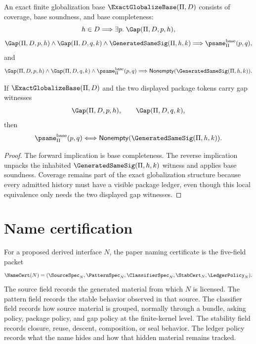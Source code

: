 \begin{definition}
\label{def:ask-sig-spine-exact-globalize-base}
An exact finite globalization base $\ExactGlobalizeBase(\Pi,D)$ consists of
coverage, base soundness, and base completeness:
$$
h\in D
\Longrightarrow
\exists p.\;\Gap(\Pi,D,p,h),
$$
$$
\Gap(\Pi,D,p,h)
\wedge
\Gap(\Pi,D,q,k)
\wedge
\GeneratedSameSig(\Pi,h,k)
\Longrightarrow
\psame^{\mathrm{base}}_{\Pi}(p,q),
$$
and
$$
\Gap(\Pi,D,p,h)
\wedge
\Gap(\Pi,D,q,k)
\wedge
\psame^{\mathrm{base}}_{\Pi}(p,q)
\Longrightarrow
\mathsf{Nonempty}(\GeneratedSameSig(\Pi,h,k)).
$$
\end{definition}

\begin{theorem}
\label{thm:ask-sig-spine-exact-globalize-classification}
If $\ExactGlobalizeBase(\Pi,D)$ and the two displayed package tokens carry
gap witnesses
$$
\Gap(\Pi,D,p,h),
\qquad
\Gap(\Pi,D,q,k),
$$
then
$$
\psame^{\mathrm{base}}_{\Pi}(p,q)
\Longleftrightarrow
\mathsf{Nonempty}(\GeneratedSameSig(\Pi,h,k)).
$$
\end{theorem}

\begin{proof}
The forward implication is base completeness.  The reverse implication
unpacks the inhabited $\GeneratedSameSig(\Pi,h,k)$ witness and applies base
soundness.  Coverage remains part of the exact globalization structure
because every admitted history must have a visible package ledger, even
though this local equivalence only needs the two displayed gap witnesses.
\end{proof}

\section{Name certification}
\label{sec:ask-sig-spine-namecert}

\begin{definition}
\label{def:ask-sig-spine-namecert-fields}
For a proposed derived interface $N$, the paper naming certificate is the
five-field packet
$$
\NameCert(N)
=
(\SourceSpec_N,\PatternSpec_N,\ClassifierSpec_N,\StabCert_N,\LedgerPolicy_N).
$$
The source field records the generated material from which $N$ is licensed.
The pattern field records the stable behavior observed in that source.  The
classifier field records how source material is grouped, normally through a
bundle, asking policy, package policy, and gap policy at the finite-kernel
level.  The stability field records closure, reuse, descent, composition, or
seal behavior.  The ledger policy records what the name hides and how that
hidden material remains tracked.
\end{definition}

